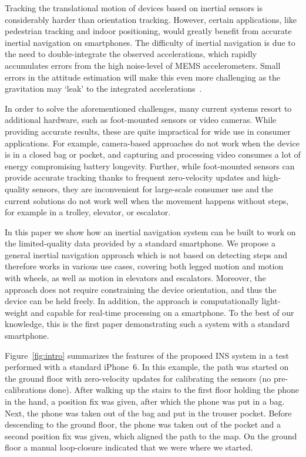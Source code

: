\documentclass[conference]{ieeetran}
\begin{document}
Tracking the translational motion of devices based on inertial sensors is considerably harder than orientation tracking. However, certain applications, like pedestrian tracking and indoor positioning, would greatly benefit from accurate inertial navigation on smartphones. The difficulty of inertial navigation is due to the need to double-integrate the observed accelerations, which rapidly accumulates errors from the high noise-level of MEMS accelerometers. Small errors in the attitude estimation will make this even more challenging as the gravitation may `leak' to the integrated accelerations~\cite{Sachs:2010}. 

In order to solve the aforementioned challenges, many current systems resort to additional hardware, such as foot-mounted sensors \cite{Foxlin:2005,Nilsson+Zachariah+Skog+Handel:2013} or video cameras.
While providing accurate results, these are quite impractical for wide use in consumer applications. For example, camera-based approaches do not work when the device is in a closed bag or pocket, and capturing and processing video consumes a lot of energy compromising battery longevity. Further, while foot-mounted sensors can provide accurate tracking thanks to frequent zero-velocity updates and high-quality sensors, they are inconvenient for large-scale consumer use and the current solutions do not work well when the movement happens without steps, for example in a trolley, elevator, or escalator. 



In this paper we show how an inertial navigation system can be built to work on the limited-quality data provided by a standard smartphone. We propose a general inertial navigation approach which is not based on detecting steps and therefore works in various use cases, covering both legged motion and motion with wheels, as well as motion in elevators and escalators. Moreover, the approach does not require constraining the device orientation, and thus the device can be held freely. In addition, the approach is computationally light-weight and capable for real-time processing on a smartphone. To the best of our knowledge, this is the first paper demonstrating such a system with a standard smartphone.

Figure~\ref{fig:intro} summarizes the features of the proposed INS system in a test performed with a standard iPhone~6. In this example, the path was started on the ground floor with zero-velocity updates for calibrating the sensors (no pre-calibrations done). After walking up the stairs to the first floor holding the phone in the hand, a position fix was given, after which the phone was put in a bag. Next, the phone was taken out of the bag and put in the trouser pocket. Before descending to the ground floor, the phone was taken out of the pocket and a second position fix was given, which aligned the path to the map. On the ground floor a manual loop-closure indicated that we were where we started.
\end{document}
